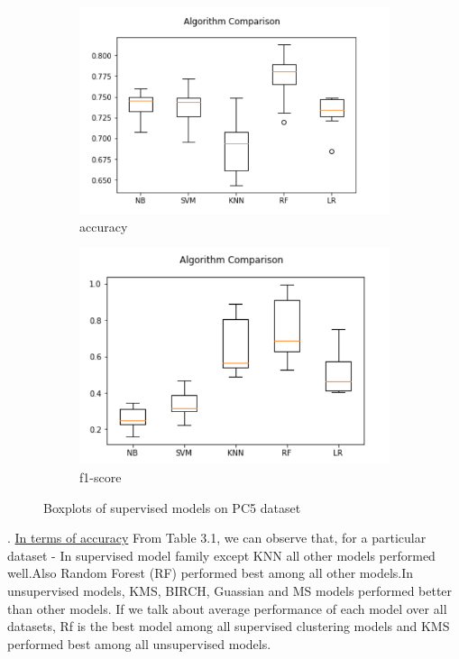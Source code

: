 \begin{figure}[h!]
  \centering
  \begin{subfigure}[b]{0.4\linewidth}
    \includegraphics[width=\linewidth]{report/PC5.png}
    \caption{accuracy}
  \end{subfigure}
  \begin{subfigure}[b]{0.4\linewidth}
    \includegraphics[width=\linewidth]{report/PC5_f.png}
    \caption{f1-score}
  \end{subfigure}
  \caption{Boxplots of supervised models on PC5 dataset}
\end{figure}

\pagebreak

. \underline{In terms of accuracy}\newline
From Table 3.1, we can observe that, for a particular dataset -
In supervised model family except KNN all other models performed well.Also Random Forest (RF) performed best among all other models.In unsupervised models, KMS, BIRCH, Guassian and MS models performed better than other models.\newline
If we talk about average performance of each model over all datasets, Rf is the best model among all supervised clustering models and KMS performed best among all unsupervised models.\newline

